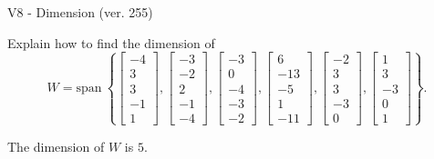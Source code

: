 \begin{exercise}
  \begin{exerciseTitle}V8 - Dimension (ver. 255)\end{exerciseTitle}
  \begin{exerciseStatement}
    Explain how to find the dimension of 
\[W=\mathrm{span}\ \left\{\left[\begin{array}{r}
-4 \\
3 \\
3 \\
-1 \\
1
\end{array}\right] , \left[\begin{array}{r}
-3 \\
-2 \\
2 \\
-1 \\
-4
\end{array}\right] , \left[\begin{array}{r}
-3 \\
0 \\
-4 \\
-3 \\
-2
\end{array}\right] , \left[\begin{array}{r}
6 \\
-13 \\
-5 \\
1 \\
-11
\end{array}\right] , \left[\begin{array}{r}
-2 \\
3 \\
3 \\
-3 \\
0
\end{array}\right] , \left[\begin{array}{r}
1 \\
3 \\
-3 \\
0 \\
1
\end{array}\right]\right\}.\]



  \end{exerciseStatement}
  \begin{exerciseAnswer}
   The dimension of \(W\) is  \(5\).
  


  \end{exerciseAnswer}
\end{exercise}